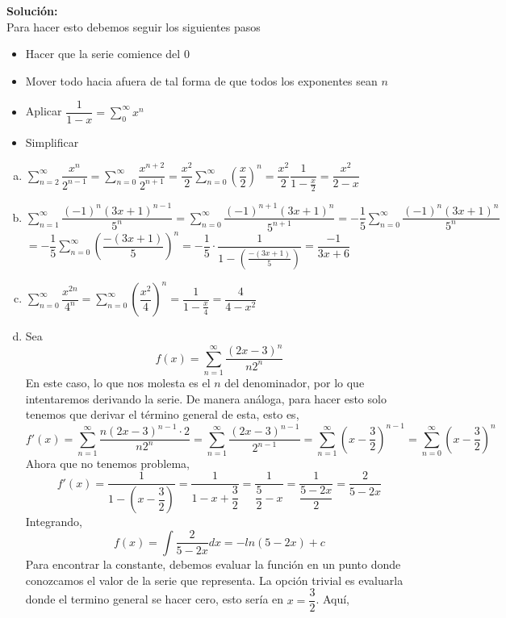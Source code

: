 \documentclass[12pt]{article}
\newenvironment{solucion}
{\begin{mdframed}[backgroundcolor=black!10]
		{\bf Solución:}\\
	}
	{
	\end{mdframed}
}
\newenvironment{preguntas}
{\begin{enumerate}\itemsep12pt
	}
	{
	\end{enumerate}
}
\begin{document}
\begin{preguntas}
\begin{solucion}
	Para hacer esto debemos seguir los siguientes pasos
	\begin{itemize}
		\item Hacer que la serie comience del 0
		\item Mover todo hacia afuera de tal forma de que todos los exponentes sean $n$
		\item Aplicar $\dfrac{1}{1-x} = \sum\limits_0^{\infty} x^n$
		\item Simplificar
	\end{itemize}
\begin{enumerate}[a)]
\item $\sum\limits_{n=2}^\infty \dfrac{x^n}{2^{n-1}}
= \sum\limits_{n=0}^\infty \dfrac{x^{n+2}}{2^{n+1}}
= \dfrac{x^2}{2} \sum\limits_{n=0}^\infty \left(\dfrac{x}{2}\right)^n
= \dfrac{x^2}{2} \dfrac{1}{1-\frac{x}{2}}
= \dfrac{x^2}{2-x}
$
\item $\sum\limits_{n=1}^\infty \dfrac{(-1)^n (3x+1)^{n-1}}{5^n}
= \sum\limits_{n=0}^\infty \dfrac{(-1)^{n+1} (3x+1)^{n}}{5^{n+1}}
= -\dfrac{1}{5} \sum\limits_{n=0}^\infty \dfrac{(-1)^{n} (3x+1)^{n}}{5^{n}}$\\
$
= -\dfrac{1}{5} \sum\limits_{n=0}^\infty \left(\dfrac{-(3x+1)}{5}\right)^n
= -\dfrac{1}{5} \cdot \dfrac{1}{1-\left(\frac{-(3x+1)}{5}\right)}
= \dfrac{-1}{3x+6}
$
\item $\sum\limits_{n=0}^\infty \dfrac{x^{2n}}{4^n}
= \sum\limits_{n=0}^\infty \left(\dfrac{x^2}{4}\right)^n
= \dfrac{1}{1-\frac{x}{4}}
= \dfrac{4}{4-x^2}	
$
\item Sea 
		$$f(x) = \sum\limits_{n=1}^\infty \dfrac{(2x-3)^n}{n2^n}$$
		En este caso, lo que nos molesta es el $n$ del denominador, por lo que intentaremos derivando la serie. De manera análoga, para hacer esto solo tenemos que derivar el término general de esta, esto es,
		$$f'(x) 
		= \sum\limits_{n=1}^\infty \dfrac{n(2x-3)^{n-1}\cdot 2}{n2^n}
		= \sum\limits_{n=1}^\infty \dfrac{(2x-3)^{n-1}}{2^{n-1}}
		= \sum\limits_{n=1}^\infty \left(x-\dfrac{3}{2}\right)^{n-1}
		= \sum\limits_{n=0}^\infty \left(x-\dfrac{3}{2}\right)^{n}$$
		Ahora que no tenemos problema,
		$$f'(x) 
		= \dfrac{1}{1-\left(x-\dfrac{3}{2}\right)}
		= \dfrac{1}{1-x+\dfrac{3}{2}}
		= \dfrac{1}{\dfrac{5}{2}-x}
		= \dfrac{1}{\dfrac{5-2x}{2}}
		= \dfrac{2}{5-2x}$$
		Integrando,
		$$f(x) 
		= \int \dfrac{2}{5-2x} dx
		= -ln (5-2x) + c$$
		Para encontrar la constante, debemos evaluar la función en un punto donde conozcamos el valor de la serie que representa. La opción trivial es evaluarla donde el termino general se hacer cero, esto sería en $x = \dfrac{3}{2}$. Aquí,

\end{enumerate}
\end{solucion}
\end{preguntas}
\end{document}
